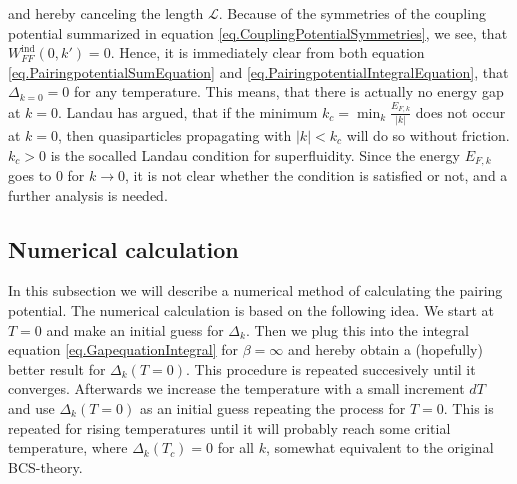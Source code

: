 and hereby canceling the length $\mathcal{L}$. Because of the symmetries of the coupling potential summarized in equation \eqref{eq.CouplingPotentialSymmetries}, we see, that $W^\text{ind}_{FF}(0,k') = 0$. Hence, it is immediately clear from both equation \eqref{eq.PairingpotentialSumEquation} and \eqref{eq.PairingpotentialIntegralEquation}, that $\Delta_{k=0} = 0$ for any temperature. This means, that there is actually no energy gap at $k=0$. Landau has argued, that if the minimum $k_c = \min_k \frac{E_{F,k}}{|k|}$ does not occur at $k=0$, then quasiparticles propagating with $|k|< k_c$ will do so without friction. $k_c > 0$ is the socalled Landau condition for superfluidity\cite{LandauStatPhys2,PlischkeStatPhys}. Since the energy $E_{F,k}$ goes to 0 for $k\to 0$, it is not clear whether the condition is satisfied or not, and a further analysis is needed. 

\subsection{Numerical calculation} \label{subsec.pairing.numerical}
In this subsection we will describe a numerical method of calculating the pairing potential. The numerical calculation is based on the following idea. We start at $T=0$ and make an initial guess for $\Delta_k$. Then we plug this into the integral equation \eqref{eq.GapequationIntegral} for $\beta = \infty$ and hereby obtain a (hopefully) better result for $\Delta_k(T=0)$. This procedure is repeated succesively until it converges. Afterwards we increase the temperature with a small increment $dT$ and use $\Delta_k(T=0)$ as an initial guess repeating the process for $T=0$. This is repeated for rising temperatures until it will probably reach some critial temperature, where $\Delta_k(T_c)=0$ for all $k$, somewhat equivalent to the original BCS-theory\cite{Tinkham,LandauStatPhys2,PlischkeStatPhys}.    

